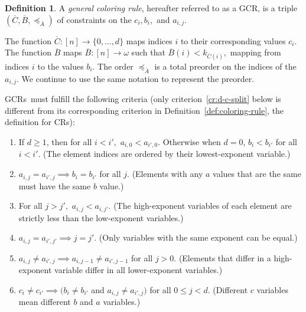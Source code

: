 \documentclass[10pt,a4paper]{article}
\newcommand{\crulenospace}{CR}
\newcommand{\crulesnospace}{\crulenospace s}
\newcommand{\gencrulenospace}{GCR}
\newcommand{\gencruleLong}{general coloring rule}
\newcommand{\gencrules}{\gencrulenospace s~}
\newcommand{\xleq}{\preceq_{\overline{A}}}
\newcommand{\assny}{\overline{B}}
\newcommand{\assnc}{\overline{C}}
\newcommand{\numpoints}{n}
\newcommand{\inumpoints}{i}
\newcommand{\idegr}{j}
\newcommand{\commonconst}{a}
\newcommand{\rareconst}{b}
\theoremstyle{plain}
\theoremstyle{definition}
\newtheorem{definition}[theorem]{Definition}
\begin{document}
\begin{definition}
A \textit{\gencruleLong}, hereafter referred to as a \gencrulenospace, is a triple $(\assnc,\assny, \xleq)$ of constraints on the $c_{\inumpoints}, \rareconst_{\inumpoints},$ and $\commonconst_{\inumpoints,\idegr}$.

The function $\assnc: [\numpoints] \to \{0,\dots,d\}$ maps indices $\inumpoints$ to their corresponding values $c_{\inumpoints}$. The function $\assny$ maps $\assny: [\numpoints] \to \omega$ such that $\assny(\inumpoints) < k_{\assnc(\inumpoints)},$ mapping from indices $\inumpoints$ to the values $\rareconst_{\inumpoints}$. The order $\xleq$ is a total preorder on the indices of the $\commonconst_{\inumpoints,\idegr}$. We continue to use the same notation to represent the preorder.

\gencrules must fulfill the following criteria (only criterion~\ref{cr:d-c-split} below is different from its corresponding criterion in Definition~\ref{def:coloring-rule}, the definition for \crulesnospace):
\begin{enumerate}
    \item \label{cr:d-index-ordering} If $d \geq 1$, then for all $\inumpoints < \inumpoints',$ $\commonconst_{\inumpoints, 0} < \commonconst_{\inumpoints', 0}.$ Otherwise when $d = 0$, $\rareconst_{\inumpoints} < \rareconst_{\inumpoints'}$ for all $\inumpoints<\inumpoints'$. (The element indices are ordered by their lowest-exponent variable.)
    \item \label{cr:d-y-distinct} $\commonconst_{\inumpoints,\idegr} = \commonconst_{\inumpoints',\idegr} \implies \rareconst_{\inumpoints} = \rareconst_{\inumpoints'}$ for all $\idegr$. (Elements with any $\commonconst$ values that are the same must have the same $\rareconst$ value.)
    \item \label{cr:d-high-first} For all $\idegr > \idegr',$ $\commonconst_{\inumpoints ,\idegr} < \commonconst_{\inumpoints, \idegr'}.$ (The high-exponent variables of each element are strictly less than the low-exponent variables.)
    
    \item \label{cr:d-term-dim-diff} $\commonconst_{\inumpoints, \idegr} = \commonconst_{\inumpoints' ,\idegr'} \implies \idegr = \idegr'$. (Only variables with the same exponent can be equal.)
    \item \label{cr:d-high-split} $\commonconst_{\inumpoints, \idegr} \neq \commonconst_{\inumpoints' ,\idegr} \implies \commonconst_{\inumpoints,\idegr-1} \neq \commonconst_{\inumpoints',\idegr-1}$ for all $\idegr>0$. (Elements that differ in a high-exponent variable differ in all lower-exponent variables.)
    \item \label{cr:d-c-split} $c_{\inumpoints} \neq c_{\inumpoints'} \implies (\rareconst_{\inumpoints} \neq \rareconst_{\inumpoints'}$ and $\commonconst_{\inumpoints ,\idegr} \neq \commonconst_{\inumpoints', \idegr})$ for all $0 \leq \idegr < d$. (Different $c$ variables mean different $\rareconst$ and $\commonconst$ variables.)
\end{enumerate}
\end{definition}
\end{document}

